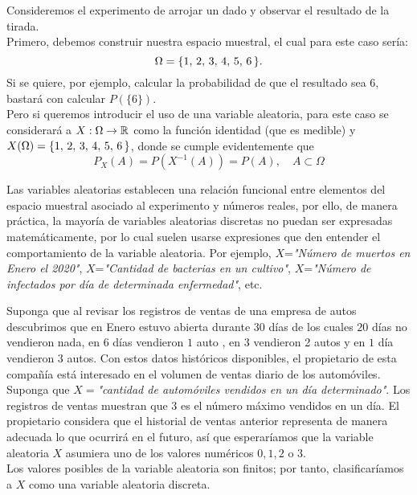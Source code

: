\begin{Ejm}
    \label{ejm-variableAleatoria-identidad}
    Consideremos el experimento de arrojar un dado y observar el resultado de la tirada.\\
    Primero, debemos construir nuestra espacio muestral, el cual para este caso sería:
    $$\Omega= \{1,\thinspace 2,\thinspace 3,\thinspace 4,\thinspace 5,\thinspace 6\thinspace\}.$$ Si se quiere, por ejemplo, calcular la probabilidad de que el resultado sea $6$, bastará con calcular $P(\{6\})$.\\ Pero si queremos introducir el uso de una variable aleatoria, para este caso se considerará a $X: \Omega \rightarrow {\mathbb{R}}$ como la función identidad (que es medible) y $X(\Omega)= \{1,\thinspace 2,\thinspace 3,\thinspace 4,\thinspace 5,\thinspace 6\thinspace\}$, donde se cumple evidentemente que $$P_X(A)=P(X^{-1}(A))=P(A),\quad  A\subset\Omega$$
\end{Ejm}
Las variables aleatorias establecen una relación funcional entre elementos del espacio muestral asociado al experimento y números reales, por ello, de manera práctica, la mayoría de variables aleatorias discretas no puedan ser expresadas matemáticamente, por lo cual suelen usarse expresiones que den entender el comportamiento de la variable aleatoria. Por ejemplo, $X$=\textit{"Número de muertos en Enero el 2020"}, $X$=\textit{"Cantidad de bacterias en un cultivo"}, $X$=\textit{"Número de infectados por día de determinada enfermedad"}, etc.\\
\label{ejm-variableAleatoria-carros}
\begin{Ejm}
    Suponga que al revisar los registros de ventas de una empresa de autos descubrimos que en Enero estuvo abierta durante $30$ días de los cuales $20$ días no vendieron nada, en $6$ días vendieron $1$ auto , en $3$ vendieron 2 autos y en $1$ día vendieron $3$ autos. Con estos datos históricos disponibles, el propietario de esta compañía está interesado en el volumen de ventas diario de los automóviles. Suponga que $X=$\textit{"cantidad de automóviles vendidos en un día determinado"}. Los registros de ventas muestran que $3$ es el número máximo vendidos en un día. El propietario considera que el historial de ventas
    anterior representa de manera adecuada lo que ocurrirá en el futuro, así que esperaríamos
    que la variable aleatoria $X$ asumiera uno de los valores numéricos $0, 1, 2$ o $ 3$.\\
    Los valores posibles de la variable aleatoria son finitos; por tanto, clasificaríamos a $X$ como una
    variable aleatoria discreta.
\end{Ejm}
